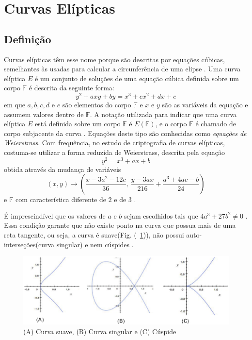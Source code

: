 %
%
\section{Curvas Elípticas}

%
%
\subsection{Definição}
Curvas elípticas têm esse nome porque são descritas por equações cúbicas, semelhantes às usadas para calcular a circunferência de uma elipse \cite{Stallings:2011}. Uma curva elíptica \(E\) é um conjunto de soluções de uma equação cúbica definida sobre um corpo \(\mathbb{F}\) é descrita da seguinte forma:
\begin{equation}
y^2 + axy + by = x^3 + cx^2 + dx + e \label{eq:5}
\end{equation}
em que \(a, b, c, d\) e \(e\) são elementos do corpo \(\mathbb{F}\) e \(x\) e \(y\) são as variáveis da equação e assumem valores dentro de \(\mathbb{F}\). A notação utilizada para indicar que uma curva elíptica \(E\) está definida sobre um corpo \(\mathbb{F}\) é $E(\mathbb{F})$, e o corpo \(\mathbb{F}\) é chamado de corpo subjacente da curva \cite{Guide}. Equações deste tipo são conhecidas como \textit{equações de Weierstrass}. Com frequência, no estudo de criptografia de curvas elípticas, costuma-se utilizar a forma reduzida de Weierstrass, descrita pela equação
\begin{equation}
y^2 = x^3 + ax + b \label{eq:6}
\end{equation}
obtida através da mudança de variáveis
\begin{equation}
  (x, y) \rightarrow \left(\frac{x - 3a^2 - 12c}{36},\ \frac{y - 3ax}{216} + \frac{a^3 + 4ac - b}{24}\right)
\end{equation}
e \(\mathbb{F}\) com característica diferente de \(2\) e de \(3\) \cite{Guide}.

É imprescindível que os valores de \(a\) e \(b\) sejam escolhidos tais que $4a^3 + 27b^2 \ne 0$ \cite{Mandy:2007}. Essa condição garante que não existe ponto na curva que possua mais de uma reta tangente, ou seja, a curva é suave(Fig. (~\ref{fig:cuspide})), não possui auto-interseções(curva singular) e nem cúspides \cite{Guide}.
\begin{figure}
\includegraphics[scale=0.6, bb=0 0 515 478]{figuras/curva_suave_singular_cuspide.eps}
\caption{(A) Curva suave, (B) Curva singular e (C) Cúspide}
\label{fig:cuspide}
\end{figure}

